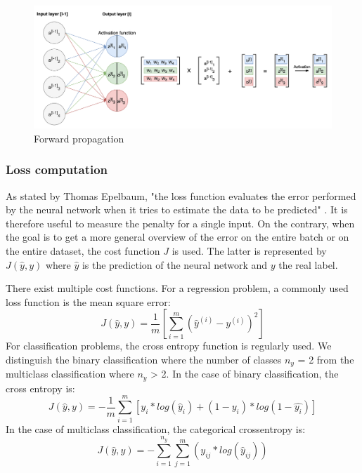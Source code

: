 \begin{figure}[!h]
\centering
\includegraphics[width=1\textwidth, keepaspectratio=true]{./figures/forward_propagation.png}
\caption{Forward propagation }
\label{forward_propagation}
\end{figure}

\subsubsection{Loss computation}
As stated by Thomas Epelbaum, "the loss function evaluates the error performed by the neural network when it tries to estimate the data to be predicted" \cite{18}. It is therefore useful to measure the penalty for a single input. On the contrary, when the goal is to get a more general overview of the error on the entire batch or on the entire dataset, the cost function $J$ is used. The latter is represented by $J(\hat{y}, y)$ where $\hat{y}$ is the prediction of the neural network and $y$ the real label. 

There exist multiple cost functions. For a regression problem, a commonly used loss function is the mean square error:
\begin{equation}
J(\hat{y}, y) = \frac{1}{m}[\sum_{i=1}^{m} (\hat{y}^{(i)} - y^{(i)})^{2}]
\end{equation}
For classification problems, the cross entropy function is regularly used. We distinguish the binary classification where the number of classes $n_{y}$ = 2 from the multiclass classification where $n_{y}$ > 2. In the case of binary classification, the cross entropy is:
\begin{equation}
J(\hat{y}, y) = -\frac{1}{m}\sum_{i=1}^{m} [y_{i}*log(\hat{y}_{i}) + (1-y_{i})*log(1-\hat{y_i})]
\end{equation}
In the case of multiclass classification, the categorical crossentropy is:
\begin{equation}
J(\hat{y}, y) = - \sum_{i=1}^{n_{y}} \sum_{j=1}^{m} (y_{ij}*log(\hat{y}_{ij}))
\end{equation}

